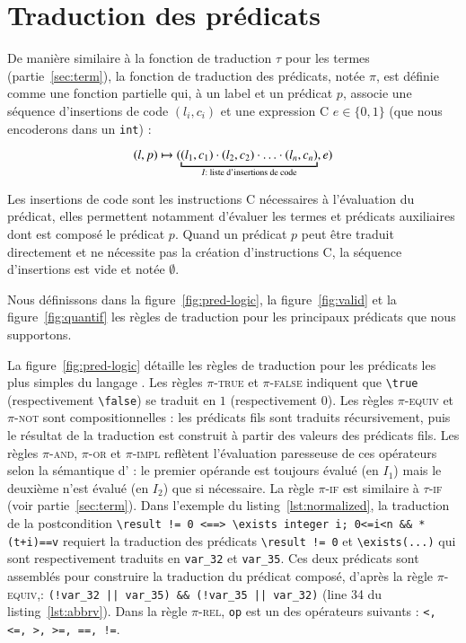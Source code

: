 \section{Traduction des prédicats \eacsl}
\label{sec:pred}


De manière similaire à la fonction de traduction $\tau$ pour les termes
(partie~\ref{sec:term}), la fonction de traduction des prédicats, notée $\pi$,
est définie comme une fonction partielle qui, à un label et un prédicat \eacsl
$p$, associe une séquence d'insertions de code $(l_i, c_i)$ et une expression C
$e \in \{0, 1\}$ (que nous encoderons dans un \lstinline'int') :

\[
(l, p) \rulearrow (\underbracket{(l_1, c_1) \concat (l_2, c_2) \concat \ldots
  \concat (l_n, c_n)}_{I : \text{ liste d'insertions de code}}, e)
\]

Les insertions de code sont les instructions C nécessaires à l'évaluation du
prédicat, elles permettent notamment d'évaluer les termes et prédicats
auxiliaires dont est composé le prédicat $p$.
Quand un prédicat $p$ peut être traduit directement et ne nécessite pas la
création d'instructions C, la séquence d'insertions est vide et notée
$\emptyset$.

Nous définissons dans la figure~\ref{fig:pred-logic}, la figure~\ref{fig:valid}
et la figure~\ref{fig:quantif} les règles de traduction pour les principaux
prédicats \eacsl que nous supportons.

La figure~\ref{fig:pred-logic} détaille les règles de traduction pour les
prédicats les plus simples du langage \eacsl.
Les règles \textsc{$\pi$-true} et \textsc{$\pi$-false} indiquent que
\lstinline'\true' (respectivement \lstinline'\false') se traduit en $1$
(respectivement $0$).
Les règles \textsc{$\pi$-equiv} et \textsc{$\pi$-not} sont compositionnelles :
les prédicats fils sont traduits récursivement, puis le résultat de la
traduction est construit à partir des valeurs des prédicats fils.
Les règles \textsc{$\pi$-and}, \textsc{$\pi$-or} et \textsc{$\pi$-impl}
reflètent l'évaluation paresseuse de ces opérateurs selon la sémantique d'\eacsl
: le premier opérande est toujours évalué (en $I_1$) mais le deuxième n'est
évalué (en $I_2$) que si nécessaire.
La règle \textsc{$\pi$-if} est similaire à \textsc{$\tau$-if} (voir
partie~\ref{sec:term}).
Dans l'exemple du listing~\ref{lst:normalized}, la traduction de la
postcondition
\lstinline{\result != 0 <==> \exists integer i; 0<=i<n && *(t+i)==v} requiert
la traduction des prédicats \lstinline|\result != 0| et
\lstinline{\exists(...)} qui sont respectivement traduits en \lstinline|var_32|
et \lstinline|var_35|.
Ces deux prédicats sont assemblés pour construire la traduction du prédicat
composé, d'après la règle \textsc{$\pi$-equiv},:
\lstinline{(!var_32 || var_35) && (!var_35 || var_32)} (line 34 du
listing~\ref{lst:abbrv}).
Dans la règle \textsc{$\pi$-rel}, \lstinline|op| est un des opérateurs suivants
: \lstinline[style=c]{<, <=, >, >=, ==, !=}.

